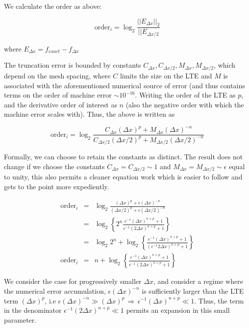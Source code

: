 We calculate the order as above:

$$\text{order}_i = \log_2\frac{||E_{\Delta x}||_2}{||E_{\Delta x/2}}$$

where $E_{\Delta x} = f_{exact} - f_{\Delta x}$

The truncation error is bounded by constants $C_{\Delta x}, C_{\Delta x / 2}, M_{\Delta x}, M_{\Delta x/2}$, which depend on the mesh spacing, where $C$ limits the size on the LTE and $M$ is associated with the aforementioned numerical source of error (and thus contains terms on the order of machine error $\sim 10^{-16}$. Writing the order of the LTE as $p$, and the derivative order of interest as $n$ (also the negative order with which the machine error scales with). Thus, the above is written as

$$\text{order}_i = \log_2\frac{C_{\Delta x}(\Delta x)^{p} + M_{\Delta x}(\Delta x)^{-n}}{C_{\Delta x / 2}(\Delta x / 2)^{p} + M_{\Delta x / 2}(\Delta x / 2)^{-n}}$$

Formally, we can choose to retain the constants as distinct. The result does not change if we choose the constants $C_{\Delta x} = C_{\Delta x/2} \sim 1$ and $M_{\Delta x} = M_{\Delta x / 2} \sim \epsilon$ equal to unity, this also permits a cleaner equation work which is easier to follow and gets to the point more expediently.

\begin{eqnarray*}
\text{order}_i & = &  \log_2\frac{(\Delta x)^{p} + \epsilon (\Delta x)^{-n}}{(\Delta x / 2)^{p} + \epsilon (\Delta x / 2)^{-n}} \\[1em]
& = & \log_2 \left\{ 2^n \frac{\epsilon^{-1}(\Delta x)^{n + p} + 1}{\epsilon^{-1}(2\Delta x)^{n + p} + 1}\right\} \\[1em]
& = & \log_2 2^n + \log_2 \left\{\frac{ \epsilon^{-1}(\Delta x)^{n + p} + 1}{(\epsilon^{-1}2\Delta x)^{n + p} + 1}\right\} \\[1em]
\text{order}_i & = & n + \log_2 \left\{\frac{ \epsilon^{-1}(\Delta x)^{n + p} + 1}{ \epsilon^{-1}(2\Delta x)^{n + p} + 1}\right\} 
\end{eqnarray*}

We consider the case for progressively smaller $\Delta x$, and consider a regime where the numerical error accumulation, $\epsilon (\Delta x)^{-n}$ is sufficiently larger than the LTE term $(\Delta x)^p$, i.e $\epsilon (\Delta x)^{-n} \gg (\Delta x)^p \, \Rightarrow \, \epsilon^{-1}(\Delta x)^{n+p} \ll 1$. Thus, the term in the denominator $\epsilon^{-1}(2\Delta x)^{n + p} \ll 1$ permits an expansion in this small parameter.

